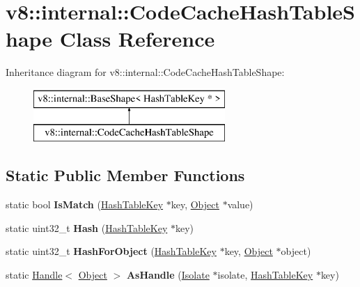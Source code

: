 \hypertarget{classv8_1_1internal_1_1_code_cache_hash_table_shape}{}\section{v8\+:\+:internal\+:\+:Code\+Cache\+Hash\+Table\+Shape Class Reference}
\label{classv8_1_1internal_1_1_code_cache_hash_table_shape}
Inheritance diagram for v8\+:\+:internal\+:\+:Code\+Cache\+Hash\+Table\+Shape\+:\begin{figure}[H]
\begin{center}
\leavevmode
\includegraphics[height=2.000000cm]{classv8_1_1internal_1_1_code_cache_hash_table_shape}
\end{center}
\end{figure}
\subsection*{Static Public Member Functions}
\begin{DoxyCompactItemize}
\item 
static bool {\bfseries Is\+Match} (\hyperlink{classv8_1_1internal_1_1_hash_table_key}{Hash\+Table\+Key} $\ast$key, \hyperlink{classv8_1_1internal_1_1_object}{Object} $\ast$value)\hypertarget{classv8_1_1internal_1_1_code_cache_hash_table_shape_a65ae88e72ba1a36856b9e99e7bf598d0}{}\label{classv8_1_1internal_1_1_code_cache_hash_table_shape_a65ae88e72ba1a36856b9e99e7bf598d0}

\item 
static uint32\+\_\+t {\bfseries Hash} (\hyperlink{classv8_1_1internal_1_1_hash_table_key}{Hash\+Table\+Key} $\ast$key)\hypertarget{classv8_1_1internal_1_1_code_cache_hash_table_shape_a7493323254a2011e99d4d52fa4a97596}{}\label{classv8_1_1internal_1_1_code_cache_hash_table_shape_a7493323254a2011e99d4d52fa4a97596}

\item 
static uint32\+\_\+t {\bfseries Hash\+For\+Object} (\hyperlink{classv8_1_1internal_1_1_hash_table_key}{Hash\+Table\+Key} $\ast$key, \hyperlink{classv8_1_1internal_1_1_object}{Object} $\ast$object)\hypertarget{classv8_1_1internal_1_1_code_cache_hash_table_shape_aa80bc42c1326645e7e75d99e436c4f3c}{}\label{classv8_1_1internal_1_1_code_cache_hash_table_shape_aa80bc42c1326645e7e75d99e436c4f3c}

\item 
static \hyperlink{classv8_1_1internal_1_1_handle}{Handle}$<$ \hyperlink{classv8_1_1internal_1_1_object}{Object} $>$ {\bfseries As\+Handle} (\hyperlink{classv8_1_1internal_1_1_isolate}{Isolate} $\ast$isolate, \hyperlink{classv8_1_1internal_1_1_hash_table_key}{Hash\+Table\+Key} $\ast$key)\hypertarget{classv8_1_1internal_1_1_code_cache_hash_table_shape_ab9a2d1ce5a124589a3baeeae7c373f73}{}\label{classv8_1_1internal_1_1_code_cache_hash_table_shape_ab9a2d1ce5a124589a3baeeae7c373f73}

\end{DoxyCompactItemize}
